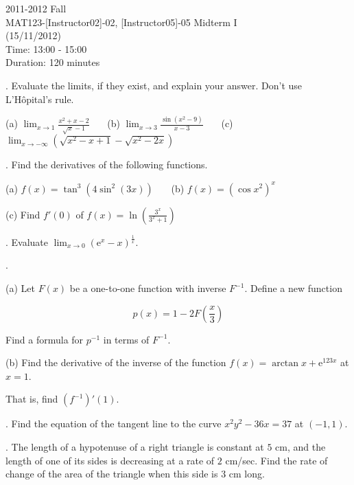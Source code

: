 \documentclass{article}
\begin{document}
\pagestyle{empty}
\large

\begin{center}
2011-2012 Fall \\MAT123-[Instructor02]-02, [Instructor05]-05 Midterm I\\(15/11/2012)\\Time: 13:00 - 15:00\\Duration: 120 minutes
\end{center}

. Evaluate the limits, if they exist, and explain your answer. Don't use L'Hôpital's rule.

\hfill

(a) $\displaystyle \lim_{x\to 1} \frac{x^2+x-2}{\sqrt x-1}$ \ \ \ (b) $\displaystyle \lim_{x\to 3} \frac{\sin(x^2-9)}{x-3}$ \ \ \ (c) $\displaystyle \lim_{x\to -\infty}\left(\sqrt{x^2-x+1}-\sqrt{x^2-2x}\right)$

\hfill

. Find the derivatives of the following functions.

\hfill

(a) $\displaystyle f(x) = \tan^3\left(4\sin^2(3x)\right)$ \ \ \ (b) $\displaystyle f(x) = \left(\cos x^2\right)^x$

\hfill

(c) Find $f'(0)$ of $\displaystyle f(x)=\ln\left(\frac{3^x}{3^x+1}\right)$

\hfill

. Evaluate $\displaystyle \lim_{x\to0}\left(\mathrm{e}^x-x\right)^{\frac1x}$.

\hfill

.

\hfill

(a) Let $F(x)$ be a one-to-one function with inverse $F^{-1}$. Define a new function

\[p(x) = 1-2F\left(\frac x3\right)\]

Find a formula for $p^{-1}$ in terms of $F^{-1}$.

\hfill

(b) Find the derivative of the inverse of the function $f(x) = \arctan x + \mathrm{e}^{123x}$ at $x=1$.

That is, find $\left(f^{-1}\right)'(1)$.

\hfill

. Find the equation of the tangent line to the curve $x^2y^2-36x=37$ at $(-1, 1)$.

\hfill

. The length of a hypotenuse of a right triangle is constant at $5$ cm, and the
length of one of its sides is decreasing at a rate of $2$ cm/sec. Find the rate of change of the area of the triangle when this side is $3$ cm long.
\end{document}
